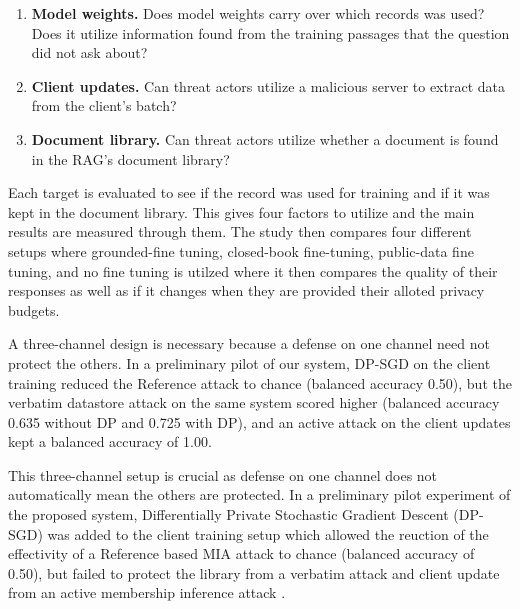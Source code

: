 \documentclass[11pt]{article}
\begin{document}
\begin{enumerate}
    \item \textbf{Model weights.} Does model weights carry over which records was used? Does it utilize information found from the training passages that the question did not ask about?
    \item \textbf{Client updates.} Can threat actors utilize a malicious server to extract data from the client's batch?
    \item \textbf{Document library.} Can threat actors utilize whether a document is found in the RAG's document library?
\end{enumerate}

Each target is evaluated to see if the record was used for training and if it was kept in the document library. This gives four factors to utilize and the main results are measured through them. The study then compares four different setups where grounded-fine tuning, closed-book fine-tuning, public-data fine tuning, and no fine tuning is utilzed where it then compares the quality of their responses as well as if it changes when they are provided their alloted privacy budgets.

A three-channel design is necessary because a defense on one channel need not protect the others. In a preliminary pilot of our system, DP-SGD on the client training reduced the Reference attack to chance (balanced accuracy 0.50), but the verbatim datastore attack on the same system scored higher (balanced accuracy 0.635 without DP and 0.725 with DP), and an active attack on the client updates kept a balanced accuracy of 1.00.

This three-channel setup is crucial as defense on one channel does not automatically mean the others are protected. In a preliminary pilot experiment of the proposed system, Differentially Private Stochastic Gradient Descent (DP-SGD) \citep{abadi2016deep} was added to the client training setup which allowed the reuction of the effectivity of a Reference based MIA attack \citep{carlini2021extracting} to chance (balanced accuracy of 0.50), but failed to protect the library from a verbatim attack \citep{anderson2024membership}  and client update from an active membership inference attack \citep{nguyen2023active}. 
\end{document}
